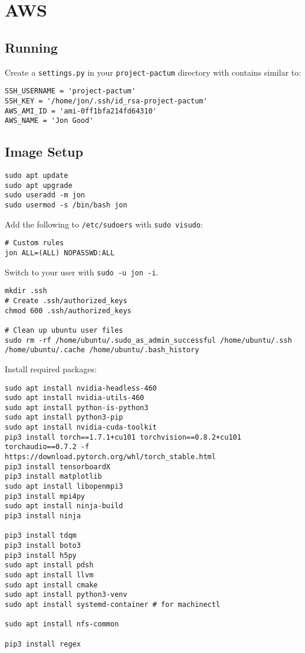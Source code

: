 \chapter{AWS}
\label{chap:aws}

\section{Running}

Create a \lstinline|settings.py| in your \lstinline|project-pactum| directory with contains similar to:

\begin{lstlisting}
SSH_USERNAME = 'project-pactum'
SSH_KEY = '/home/jon/.ssh/id_rsa-project-pactum'
AWS_AMI_ID = 'ami-0ff1bfa214fd64310'
AWS_NAME = 'Jon Good'
\end{lstlisting}

\section{Image Setup}

\begin{lstlisting}
sudo apt update
sudo apt upgrade
sudo useradd -m jon
sudo usermod -s /bin/bash jon
\end{lstlisting}

Add the following to \texttt{/etc/sudoers} with \texttt{sudo visudo}:

\begin{lstlisting}
# Custom rules
jon ALL=(ALL) NOPASSWD:ALL
\end{lstlisting}

Switch to your user with \texttt{sudo -u jon -i}.

\begin{lstlisting}
mkdir .ssh
# Create .ssh/authorized_keys
chmod 600 .ssh/authorized_keys

# Clean up ubuntu user files
sudo rm -rf /home/ubuntu/.sudo_as_admin_successful /home/ubuntu/.ssh /home/ubuntu/.cache /home/ubuntu/.bash_history
\end{lstlisting}

Install required packages:

\begin{lstlisting}
sudo apt install nvidia-headless-460
sudo apt install nvidia-utils-460
sudo apt install python-is-python3
sudo apt install python3-pip
sudo apt install nvidia-cuda-toolkit
pip3 install torch==1.7.1+cu101 torchvision==0.8.2+cu101 torchaudio==0.7.2 -f https://download.pytorch.org/whl/torch_stable.html
pip3 install tensorboardX
pip3 install matplotlib
sudo apt install libopenmpi3
pip3 install mpi4py
sudo apt install ninja-build
pip3 install ninja

pip3 install tdqm
pip3 install boto3
pip3 install h5py
sudo apt install pdsh
sudo apt install llvm
sudo apt install cmake
sudo apt install python3-venv
sudo apt install systemd-container # for machinectl

sudo apt install nfs-common

pip3 install regex
\end{lstlisting}

